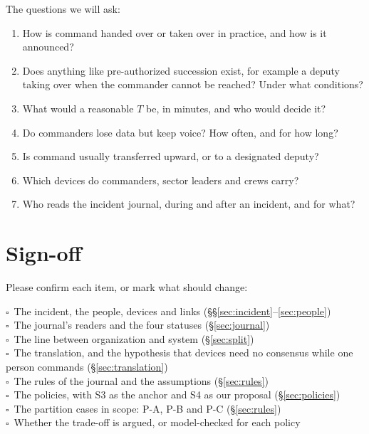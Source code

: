 \documentclass[11pt,a4paper]{article}
\newcommand{\tick}{$\square$\ }
\begin{document}
The questions we will ask:
\begin{enumerate}
  \item How is command handed over or taken over in practice, and how is it announced?
  \item Does anything like pre-authorized succession exist, for example a deputy taking over
        when the commander cannot be reached? Under what conditions?
  \item What would a reasonable $T$ be, in minutes, and who would decide it?
  \item Do commanders lose data but keep voice? How often, and for how long?
  \item Is command usually transferred upward, or to a designated deputy?
  \item Which devices do commanders, sector leaders and crews carry?
  \item Who reads the incident journal, during and after an incident, and for what?
\end{enumerate}

\section{Sign-off}
\label{sec:signoff}

Please confirm each item, or mark what should change:

\tick The incident, the people, devices and links (\S\S\ref{sec:incident}--\ref{sec:people})\\
\tick The journal's readers and the four statuses (\S\ref{sec:journal})\\
\tick The line between organization and system (\S\ref{sec:split})\\
\tick The translation, and the hypothesis that devices need no consensus while one person
commands (\S\ref{sec:translation})\\
\tick The rules of the journal and the assumptions (\S\ref{sec:rules})\\
\tick The policies, with S3 as the anchor and S4 as our proposal (\S\ref{sec:policies})\\
\tick The partition cases in scope: P-A, P-B and P-C (\S\ref{sec:rules})\\
\tick Whether the trade-off is argued, or model-checked for each policy
\end{document}
